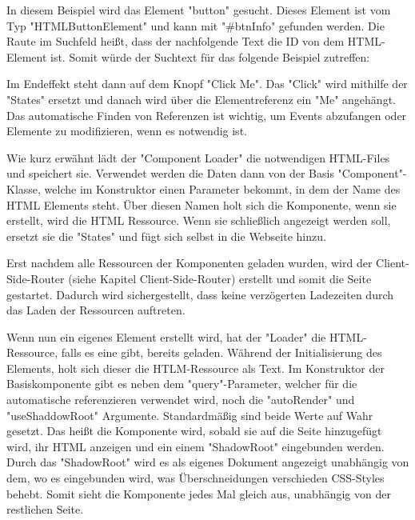 
In diesem Beispiel wird das Element "button" gesucht. Dieses Element ist vom Typ "HTMLButtonElement" und kann mit "\#btnInfo" gefunden werden. Die Raute im Suchfeld heißt, dass der nachfolgende Text die ID von dem HTML-Element ist. Somit würde der Suchtext für das folgende Beispiel zutreffen:


Im Endeffekt steht dann auf dem Knopf "Click Me". Das "Click" wird mithilfe der
"States" ersetzt und danach wird über die Elementreferenz ein "Me" angehängt. Das automatische Finden von Referenzen ist wichtig, um Events abzufangen oder Elemente zu modifizieren, wenn es notwendig ist.

Wie kurz erwähnt lädt der "Component Loader" die notwendigen HTML-Files und speichert sie. Verwendet werden die Daten dann von der Basis "Component"- Klasse, welche im Konstruktor einen Parameter bekommt, in dem der Name des HTML Elements steht. Über diesen Namen holt sich die Komponente, wenn sie erstellt, wird die HTML Ressource. Wenn sie schließlich angezeigt werden soll, ersetzt sie die "States" und fügt sich selbst in die Webseite hinzu.


Erst nachdem alle Ressourcen der Komponenten geladen wurden, wird der Client-Side-Router (siehe Kapitel Client-Side-Router) erstellt und somit die Seite gestartet. Dadurch wird sichergestellt, dass keine verzögerten Ladezeiten durch das Laden der Ressourcen auftreten.


Wenn nun ein eigenes Element erstellt wird, hat der "Loader" die HTML-Ressource, falls es eine gibt, bereits geladen. Während der Initialisierung des Elements, holt sich dieser die HTLM-Ressource als Text. Im Konstruktor der Basiskomponente gibt es neben dem "query"-Parameter, welcher für die automatische referenzieren verwendet wird, noch die "autoRender" und "useShaddowRoot" Argumente. Standardmäßig sind beide Werte auf Wahr gesetzt. Das heißt die Komponente wird, sobald sie auf die Seite hinzugefügt wird, ihr HTML anzeigen und ein einem "ShadowRoot" eingebunden werden. Durch das "ShadowRoot" wird es als eigenes Dokument angezeigt unabhängig von dem, wo es eingebunden wird, was Überschneidungen verschieden CSS-Styles behebt. Somit sieht die Komponente jedes Mal gleich aus, unabhängig von der restlichen Seite.

